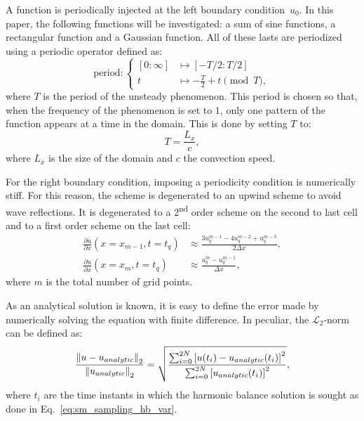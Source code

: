 A function is periodically injected at the left boundary
condition~$u_0$.
In this paper, the following functions will be
investigated: a sum of sine functions, a rectangular
function and a Gaussian function. All of these lasts are periodized
using a periodic operator defined as:
\begin{equation}
    \text{period} \colon
    \begin{cases}
        [0: \infty] & \longmapsto[-T/2: T/2]\\
        t & \longmapsto \displaystyle - \frac{T}{2} + t \pmod T,
    \end{cases}
    \label{eq:periodic_operator}
\end{equation}
where $T$ is the period of the unsteady phenomenon. This period 
is chosen so that, when the frequency of the 
phenomenon is set to $1$, only one pattern of the function 
appears at a time in the domain.
This is done by setting $T$ to:
\begin{equation}
   T = \frac{L_x}{c},
   \label{eq:time_spatial_correspondence}
\end{equation}
where $L_x$ is the size of the domain and $c$ the convection speed.

For the right boundary condition, imposing a periodicity condition is
numerically stiff. For this reason, the scheme is degenerated 
to an upwind scheme to avoid wave reflections. It is degenerated to
a 2\textsuperscript{nd} order scheme on the second to last cell
and to a first order scheme on the last cell:
\begin{align}
    \frac{\partial u}{\partial x} (x = x_{m-1}, t=t_q) &\approx 
    \frac{3 u^{m-1}_{q} - 4 u^{m-2}_{q} + u^{m-3}_{q}}{2\Delta x}, \\
    \frac{\partial u}{\partial x} (x = x_m, t=t_q) &\approx 
    \frac{u^{m}_{q} - u^{m-1}_{q}}{\Delta x},
\label{eq:upwind_scheme}
\end{align}
where $m$ is the total number of grid points.

As an analytical solution is known, it is easy to define the error
made by numerically solving the equation with finite difference.
In peculiar, the $\mathcal{L}_2$-norm can be defined as:
\begin{equation}
    \frac{\norm{u-u_{analytic}}_2}{\norm{u_{analytic}}_2} = 
    \sqrt{\frac{\sum_{i=0}^{2N} \left[u(t_i) - u_{analytic}(t_i)  \right]^2}{
    \sum_{i=0}^{2N} \left[u_{analytic}(t_i)\right]^2}},
    \label{eq:l2_norm}
\end{equation}
where $t_i$ are the time instants
in which the harmonic balance solution is sought as 
done in Eq.~\eqref{eq:sm_sampling_hb_var}.
